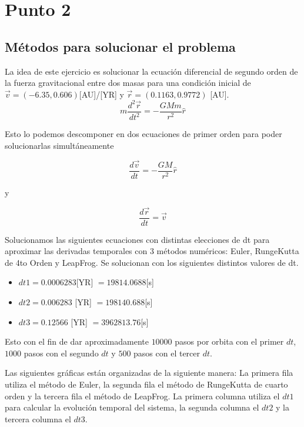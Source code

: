 \documentclass{article}
\begin{document}
\pagebreak

\section*{Punto 2}

\subsection*{M\'etodos para solucionar el problema}
La idea de este ejercicio es solucionar la ecuaci\'on diferencial de segundo orden de la fuerza gravitacional entre dos masas para una condici\'on inicial de $\Vec{v} = (-6.35,0.606) $[AU]/[YR] y $\Vec{r} = (0.1163,0.9772)$ [AU].
\begin{equation*}
   m \frac{d^2 \Vec{r}}{dt^2} = -\frac{GMm }{r^2} \hat{r}
\end{equation*}

Esto lo podemos descomponer en dos ecuaciones de primer orden para poder solucionarlas simult\'aneamente

\begin{equation*}
    \frac{d \Vec{v}}{dt} = -\frac{GM }{r^2} \hat{r}
\end{equation*}

y

\begin{equation*}
    \frac{d\Vec{r}}{dt} = \Vec{v}
\end{equation*}

Solucionamos las siguientes ecuaciones con distintas elecciones de dt para aproximar las derivadas temporales con 3 m\'etodos num\'ericos: Euler, RungeKutta de 4to Orden y LeapFrog. Se solucionan con los siguientes distintos valores de dt. 
\begin{itemize}
    \item $dt1=0.0006283 $[YR] $= 19814.0688$[s]
    \item $dt2 = 0.006283$ [YR] $= 198140.688$[s]
    \item $dt3 = 0.12566$ [YR] $= 3962813.76$[s]
\end{itemize}

Esto con el fin de dar aproximadamente $10000$ pasos por orbita con el primer $dt$, $1000$ pasos con el segundo $dt$ y $500$ pasos con el tercer $dt$.


Las siguientes gr\'aficas est\'an organizadas de la siguiente manera: La primera fila utiliza el m\'etodo de Euler, la segunda fila el m\'etodo de RungeKutta de cuarto orden y la tercera fila el m\'etodo de LeapFrog. La primera columna utiliza el $dt1$ para calcular la evoluci\'on temporal del sistema, la segunda columna el $dt2$ y la tercera columna el $dt3$.
\end{document}
